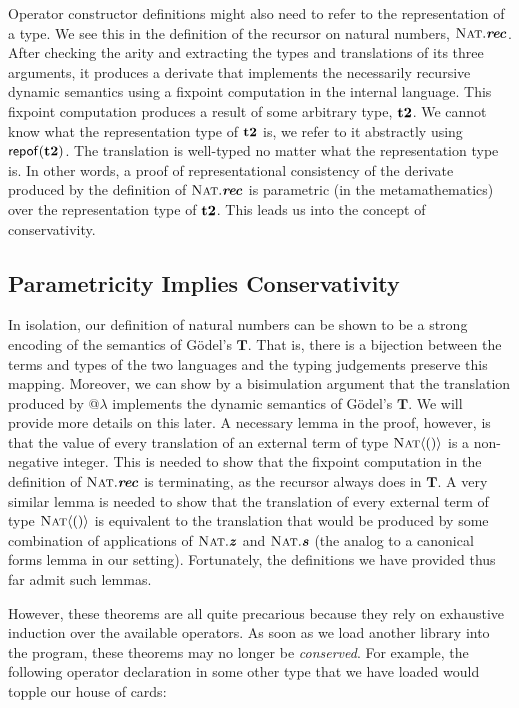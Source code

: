 Operator constructor definitions might also need to refer to the representation of a type. We see this in the definition of the recursor on natural numbers, $\textsc{Nat}.\textbf{\textit{rec}}$. After checking the arity and extracting the types and translations of its three arguments, it produces a derivate that implements the necessarily recursive dynamic semantics using a fixpoint computation in the internal language. This fixpoint computation produces a result of some arbitrary type, ${\textbf{t2}}$. We cannot know what the representation type of ${\textbf{t2}}$ is, we refer to it abstractly using ${\sf repof}({\textbf{t2}})$. The translation is well-typed no matter what the representation type is. In other words, a proof of representational consistency of the derivate produced by the definition of $\textsc{Nat}.\textbf{\textit{rec}}$ is parametric (in the metamathematics) over the representation type of ${\textbf{t2}}$. This leads us into the concept of conservativity.

\subsection{Parametricity Implies Conservativity}
In isolation, our definition of natural numbers can be shown to be a strong encoding of the semantics of G\"odel's $\mathbf{T}$. That is, there is a bijection between the terms and types of the two languages and the typing judgements preserve this mapping. Moreover, we can show by a bisimulation argument that the translation produced by @$\lambda$ implements the dynamic semantics of G\"odel's $\mathbf{T}$. We will provide more details on this later. A necessary lemma in the proof, however, is that the value of every translation of an external term of type $\textsc{Nat}\langle()\rangle$ is a non-negative integer. This is needed to show that the fixpoint computation in the definition of $\textsc{Nat}.\textbf{\textit{rec}}$ is terminating, as the recursor always does in $\mathbf{T}$. A very similar lemma is needed to show that the translation of every external term of type $\textsc{Nat}\langle()\rangle$ is equivalent to the translation that would be produced by some combination of applications of $\textsc{Nat}.\textbf{\textit{z}}$ and $\textsc{Nat}.\textbf{\textit{s}}$ (the analog to a canonical forms lemma in our setting). Fortunately, the definitions we have provided thus far admit such lemmas.

However, these theorems are all quite precarious because they rely on exhaustive induction over the available operators. As soon as we load another library into the program, these theorems may no longer be \emph{conserved}. For example, the following operator declaration in some other type that we have loaded would topple our house of cards:





